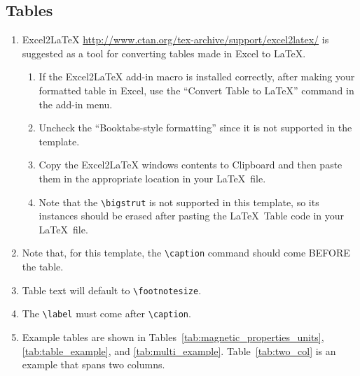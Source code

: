 \subsection{Tables}

\begin{enumerate}
	\item Excel2LaTeX \url{http://www.ctan.org/tex-archive/support/excel2latex/} is suggested as a tool for converting tables made in Excel to LaTeX. 
		
	\begin{enumerate}
		\item If the Excel2LaTeX add-in macro is installed correctly, after making your formatted table in Excel, use the ``Convert Table to \LaTeX'' command in the add-in menu.
		
		\item Uncheck the ``Booktabs-style formatting'' since it is not supported in the template.
		
		\item Copy the Excel2LaTeX windows contents to Clipboard and then paste them in the appropriate location in your \LaTeX\ file.
		
		\item Note that the \verb|\bigstrut| is not supported in this template, so its instances should be erased after pasting the \LaTeX\ Table code in your \LaTeX\ file.
	\end{enumerate}

	\item Note that, for this template, the \verb|\caption| command should come BEFORE the table.
	
	\item Table text will default to \verb|\footnotesize|.  
	
	\item The \verb|\label| must come after \verb|\caption|.
	
	\item Example tables are shown in Tables~\ref{tab:magnetic_properties_units}, \ref{tab:table_example}, and \ref{tab:multi_example}. Table~\ref{tab:two_col} is an example that spans two columns.

\end{enumerate}




